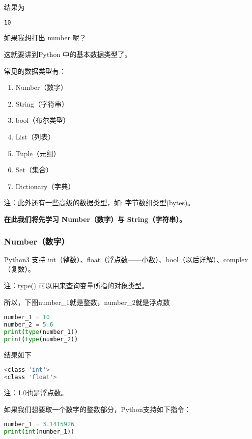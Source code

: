 结果为

\begin{lstlisting}[language=bash]
10
\end{lstlisting}

如果我想打出 number 呢？

这就要讲到Python 中的基本数据类型了。

常见的数据类型有：

\begin{enumerate}
\item Number（数字）
\item String（字符串）
\item bool（布尔类型）
\item List（列表）
\item Tuple（元组）
\item Set（集合）
\item Dictionary（字典）
\end{enumerate}

注：此外还有一些高级的数据类型，如: 字节数组类型(bytes)。

\textbf{在此我们将先学习 Number（数字）与 String（字符串）。}

\subsubsection{Number（数字）}

Python3 支持 int（整数）、float（浮点数——小数）、bool（以后详解）、complex（复数）。

注：type() 可以用来查询变量所指的对象类型。

所以，下图number_1就是整数，number_2就是浮点数

\begin{lstlisting}[language=python]
number_1 = 10 
number_2 = 5.6
print(type(number_1))
print(type(number_2))
\end{lstlisting}

结果如下

\begin{lstlisting}[language=bash]
<class 'int'>
<class 'float'>
\end{lstlisting}

注：1.0也是浮点数。

如果我们想要取一个数字的整数部分，Python支持如下指令：

\begin{lstlisting}[language=python]
number_1 = 3.1415926
print(int(number_1))
\end{lstlisting}

